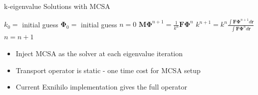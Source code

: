 \documentclass{beamer}
\begin{document}
\begin{frame}[fragile]{k-eigenvalue Solutions with MCSA}

  \begin{algorithm}[H]
    \caption{Power Iteration MCSA Scheme}
    \label{alg:power_iteration}
    \begin{algorithmic}
      \STATE $k_0 =$ initial guess
      \STATE $\mathbf{\Phi}_0 =$ initial guess
      \STATE $n = 0$
      \STATE $\mathbf{M} \mathbf{\Phi}^{n+1} = \frac{1}{k^n} \mathbf{F} \mathbf{\Phi}^n$
      \STATE $k^{n+1} = k^n \frac{\int \mathbf{F} \mathbf{\Phi}^{n+1} d\mathbf{r}}{\int
        \mathbf{F} \mathbf{\Phi}^n d\mathbf{r}}$
      \STATE $n = n+1$
      \ENDWHILE
    \end{algorithmic}
  \end{algorithm}

  \begin{itemize}
  \item Inject MCSA as the solver at each eigenvalue iteration
    \medskip
  \item Transport operator is static - one time cost for MCSA setup
    \medskip
  \item Current Exnihilo implementation gives the full operator
  \end{itemize}

\end{frame}
\end{document}

